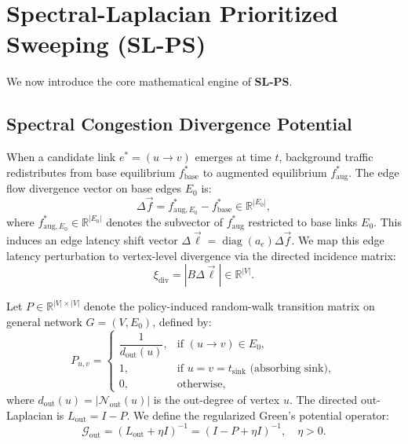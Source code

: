 \documentclass[11pt,a4paper]{article}
\begin{document}
\section{Spectral-Laplacian Prioritized Sweeping (SL-PS)}
\label{sec:method}

We now introduce the core mathematical engine of \textbf{SL-PS}.

\subsection{Spectral Congestion Divergence Potential}
When a candidate link $e^* = (u \to v)$ emerges at time $t$, background traffic redistributes from base equilibrium $f_{\text{base}}^*$ to augmented equilibrium $f_{\text{aug}}^*$. The edge flow divergence vector on base edges $E_0$ is:
\begin{equation}
\Delta \vec{f} = f_{\text{aug}, E_0}^* - f_{\text{base}}^* \in \mathbb{R}^{|E_0|},
\end{equation}
where $f_{\text{aug}, E_0}^* \in \mathbb{R}^{|E_0|}$ denotes the subvector of $f_{\text{aug}}^*$ restricted to base links $E_0$. This induces an edge latency shift vector $\Delta \vec{\ell} = \operatorname{diag}(a_e) \Delta \vec{f}$. We map this edge latency perturbation to vertex-level divergence via the directed incidence matrix:
\begin{equation}
\xi_{\text{div}} = |B \Delta \vec{\ell}| \in \mathbb{R}^{|V|}.
\end{equation}

Let $P \in \mathbb{R}^{|V| \times |V|}$ denote the policy-induced random-walk transition matrix on general network $G = (V, E_0)$, defined by:
\begin{equation}
P_{u, v} = 
\begin{cases}
\dfrac{1}{d_{\text{out}}(u)}, & \text{if } (u \to v) \in E_0, \\
1, & \text{if } u = v = t_{\text{sink}} \text{ (absorbing sink)}, \\
0, & \text{otherwise},
\end{cases}
\end{equation}
where $d_{\text{out}}(u) = |\mathcal{N}_{\text{out}}(u)|$ is the out-degree of vertex $u$. The directed out-Laplacian is $L_{\text{out}} = I - P$. We define the regularized Green's potential operator:
\begin{equation}
\mathcal{G}_{\text{out}} = (L_{\text{out}} + \eta I)^{-1} = (I - P + \eta I)^{-1}, \quad \eta > 0.
\end{equation}
\end{document}
